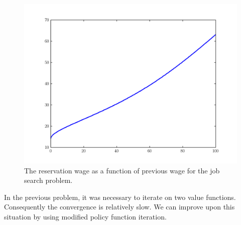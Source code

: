 \begin{figure}
\includegraphics[width=\textwidth]{reservation_wage.pdf}
\caption{The reservation wage as a function of previous wage for the job search problem.}
\label{fig:res_wage}
\end{figure}

In the previous problem, it was necessary to iterate on two value functions.
Consequently the convergence is relatively slow.
We can improve upon this situation by using modified policy function iteration.

